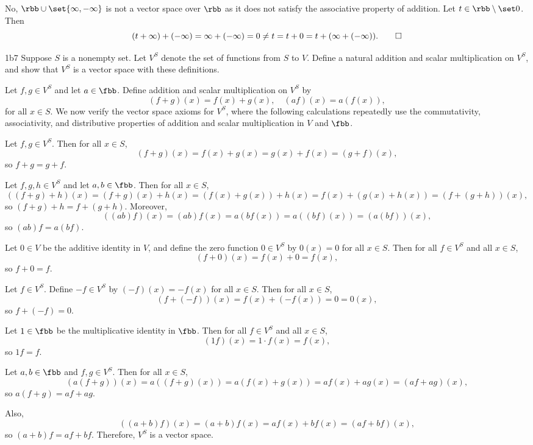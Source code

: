 \begin{sol}
    No, $\rbb \cup \set{\infty, -\infty}$ is not a vector space over $\rbb$ as it does not satisfy the associative property of addition.
	Let $t \in \rbb \setminus \set 0$.
	Then
    \[
    	(t + \infty) + (-\infty) = \infty + (-\infty) = 0 \neq t = t + 0 = t + (\infty + (-\infty)). \qedhere
    \]
\end{sol}

\begin{exercise}{1b7}
    Suppose $S$ is a nonempty set.
	Let $V^S$ denote the set of functions from $S$ to $V$.
	Define a natural addition and scalar multiplication on $V^S$, and show that $V^S$ is a vector space with these definitions.
\end{exercise}

\begin{sol}
    Let $f, g \in V^S$ and let $a \in \fbb$.
    Define addition and scalar multiplication on $V^S$ by
    \[
        (f + g)(x) = f(x) + g(x), \quad (af)(x) = a(f(x)),
    \]
    for all $x \in S$.
    We now verify the vector space axioms for $V^S$, where the following calculations repeatedly use the commutativity, associativity, and distributive properties of addition and scalar multiplication in $V$ and $\fbb$.

     Let $f, g \in V^S$.
    Then for all $x \in S$,
    \[
        (f + g)(x) = f(x) + g(x) = g(x) + f(x) = (g + f)(x),
    \]
    so $f + g = g + f$.

     Let $f, g, h \in V^S$ and let $a, b \in \fbb$.
    Then for all $x \in S$,
    \[
        ((f + g) + h)(x) = (f + g)(x) + h(x) = (f(x) + g(x)) + h(x) = f(x) + (g(x) + h(x)) = (f + (g + h))(x),
    \]
    so $(f + g) + h = f + (g + h)$.
    Moreover,
    \[
        ((ab)f)(x) = (ab)f(x) = a(bf(x)) = a((bf)(x)) = (a(bf))(x),
    \]
    so $(ab)f = a(bf)$.

     Let $0 \in V$ be the additive identity in $V$, and define the zero function $0 \in V^S$ by $0(x) = 0$ for all $x \in S$.
    Then for all $f \in V^S$ and all $x \in S$,
    \[
        (f + 0)(x) = f(x) + 0 = f(x),
    \]
    so $f + 0 = f$.

     Let $f \in V^S$.
    Define $-f \in V^S$ by $(-f)(x) = -f(x)$ for all $x \in S$.
    Then for all $x \in S$,
    \[
        (f + (-f))(x) = f(x) + (-f(x)) = 0 = 0(x),
    \]
    so $f + (-f) = 0$.

     Let $1 \in \fbb$ be the multiplicative identity in $\fbb$.
    Then for all $f \in V^S$ and all $x \in S$,
    \[
        (1f)(x) = 1 \cdot f(x) = f(x),
    \]
    so $1f = f$.

     Let $a, b \in \fbb$ and $f, g \in V^S$.
    Then for all $x \in S$,
    \[
        (a(f + g))(x) = a((f + g)(x)) = a(f(x) + g(x)) = af(x) + ag(x) = (af + ag)(x),
    \]
    so $a(f + g) = af + ag$.

    Also,
    \[
        ((a + b)f)(x) = (a + b)f(x) = af(x) + bf(x) = (af + bf)(x),
    \]
    so $(a + b)f = af + bf$.
    Therefore, $V^S$ is a vector space.
\end{sol}

